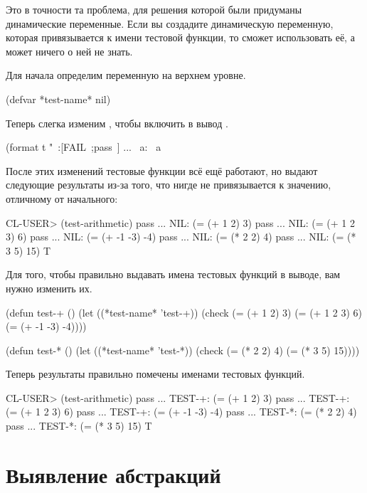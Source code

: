 Это в точности та проблема, для решения которой были придуманы динамические
переменные. Если вы создадите динамическую переменную, которая привязывается к имени
тестовой функции, то  сможет использовать её, а  может
ничего о ней не знать.

Для начала определим переменную на верхнем уровне.

\begin{myverb}
(defvar *test-name* nil)
\end{myverb}

Теперь слегка изменим , чтобы включить  в вывод
.

\begin{myverb}
(format t "~:[FAIL~;pass~] ... ~a: ~a~%
\end{myverb}

После этих изменений тестовые функции всё ещё работают, но выдают следующие результаты
из-за того, что  нигде не привязывается к значению, отличному от
начального:

\begin{myverb}
CL-USER> (test-arithmetic)
pass ... NIL: (= (+ 1 2) 3)
pass ... NIL: (= (+ 1 2 3) 6)
pass ... NIL: (= (+ -1 -3) -4)
pass ... NIL: (= (* 2 2) 4)
pass ... NIL: (= (* 3 5) 15)
T
\end{myverb}

Для того, чтобы правильно выдавать имена тестовых функций в выводе, вам нужно изменить их.

\begin{myverb}
(defun test-+ ()
  (let ((*test-name* 'test-+))
    (check
      (= (+ 1 2) 3)
      (= (+ 1 2 3) 6)
      (= (+ -1 -3) -4))))

(defun test-* ()
  (let ((*test-name* 'test-*))
    (check
      (= (* 2 2) 4)
      (= (* 3 5) 15))))
\end{myverb}

Теперь результаты правильно помечены именами тестовых функций.

\begin{myverb}
CL-USER> (test-arithmetic)
pass ... TEST-+: (= (+ 1 2) 3)
pass ... TEST-+: (= (+ 1 2 3) 6)
pass ... TEST-+: (= (+ -1 -3) -4)
pass ... TEST-*: (= (* 2 2) 4)
pass ... TEST-*: (= (* 3 5) 15)
T
\end{myverb}

\section{Выявление абстракций}

